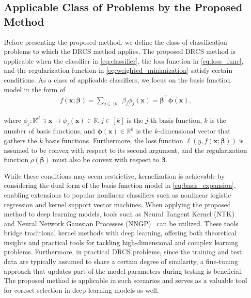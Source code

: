 \subsection{Applicable Class of Problems by the Proposed Method} \label{sec:applicable-class}
%
Before presenting the proposed method, we define the class of classification problems to which the DRCS method applies.
%
The proposed DRCS method is applicable when the classifier in \eqref{eq:classifier}, the loss function in \eqref{eq:loss_func}, and the regularization function in \eqref{eq:weighted_minimization} satisfy certain conditions.
%
As a class of applicable classifiers, we focus on the basis function model in the form of
\begin{align}
 \label{eq:basis_expansion}
 f(\bm{x}; \bm{\beta}) = \sum_{j\in [k]} \beta_j \phi_j(\bm{x}) = \bm{\beta}^\top \bm{\phi}(\bm{x}),
\end{align}

where $\phi_j: \mathbb{R}^d \ni \bm{x} \mapsto \phi_j(\bm{x}) \in \mathbb{R}, j \in [k]$ is the $j$-th basis function, $k$ is the number of basis functions, and $\bm{\phi}(\bm{x}) \in \mathbb{R}^k$ is the $k$-dimensional vector that gathers the $k$ basis functions.
%
Furthermore, the loss function $\ell(y, f(\bm{x}; \bm{\beta}))$ is assumed to be convex with respect to its second argument, and the regularization function $\rho(\bm{\beta})$ must also be convex with respect to $\bm{\beta}$.

While these conditions may seem restrictive, kernelization is achievable by considering the dual form of the basis function model in \eqref{eq:basis_expansion}, enabling extensions to popular nonlinear classifiers such as nonlinear logistic regression and kernel support vector machines.  
%
When applying the proposed method to deep learning models, tools such as Neural Tangent Kernel (NTK)~\citep{neuraltangents2020} and Neural Network Gaussian Processes (NNGP)~\citep{lee2017deep} can be utilized.
%
These tools bridge traditional kernel methods with deep learning, offering both theoretical insights and practical tools for tackling high-dimensional and complex learning problems.  
%
Furthermore, in practical DRCS problems, since the training and test data are typically assumed to share a certain degree of similarity, a fine-tuning approach that updates part of the model parameters during testing is beneficial.  
%
The proposed method is applicable in such scenarios and serves as a valuable tool for coreset selection in deep learning models as well.








